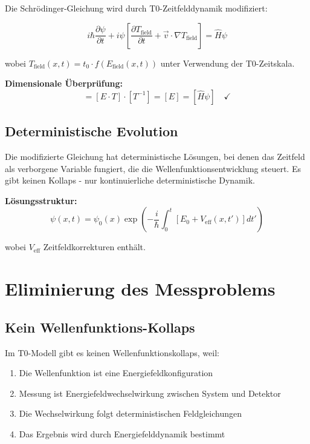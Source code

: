 \documentclass[12pt,a4paper]{report}
\begin{document}
	Die Schrödinger-Gleichung wird durch T0-Zeitfelddynamik modifiziert:
	
	\begin{equation}
		\boxed{i \hbar \frac{\partial\psi}{\partial t} + i\psi\left[\frac{\partial T_{\text{field}}}{\partial t} + \vec{v} \cdot \nabla T_{\text{field}}\right] = \hat{H}\psi}
		\label{eq:modified_schrodinger}
	\end{equation}
	
	wobei $T_{\text{field}}(x,t) = t_0 \cdot f(E_{\text{field}}(x,t))$ unter Verwendung der T0-Zeitskala.
	
	\textbf{Dimensionale Überprüfung:}
	\begin{equation}
		[i \hbar \partial_t \psi] = [E \cdot T] \cdot [T^{-1}] = [E] = [\hat{H}\psi] \quad \checkmark
	\end{equation}
	
	\subsection{Deterministische Evolution}
	\label{subsec:deterministic_evolution}
	
	Die modifizierte Gleichung hat deterministische Lösungen, bei denen das Zeitfeld als verborgene Variable fungiert, die die Wellenfunktionsentwicklung steuert. Es gibt keinen Kollaps - nur kontinuierliche deterministische Dynamik.
	
	\textbf{Lösungsstruktur:}
	\begin{equation}
		\psi(x,t) = \psi_0(x) \exp\left(-\frac{i}{\hbar} \int_0^t \left[E_0 + V_{\text{eff}}(x,t')\right] dt'\right)
	\end{equation}
	
	wobei $V_{\text{eff}}$ Zeitfeldkorrekturen enthält.
	
	\section{Eliminierung des Messproblems}
	\label{sec:measurement_problem}
	
	\subsection{Kein Wellenfunktions-Kollaps}
	\label{subsec:no_collapse}
	
	Im T0-Modell gibt es keinen Wellenfunktionskollaps, weil:
	
	\begin{enumerate}
		\item Die Wellenfunktion ist eine Energiefeldkonfiguration
		\item Messung ist Energiefeldwechselwirkung zwischen System und Detektor
		\item Die Wechselwirkung folgt deterministischen Feldgleichungen
		\item Das Ergebnis wird durch Energiefelddynamik bestimmt
	\end{enumerate}
	
\end{document}
